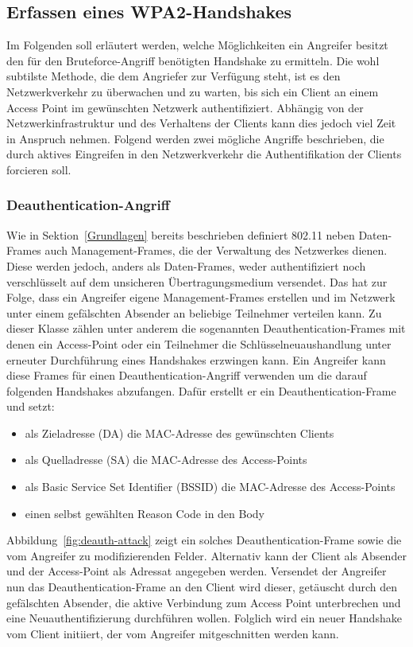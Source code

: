 \subsection{Erfassen eines WPA2-Handshakes}
Im Folgenden soll erläutert werden, welche Möglichkeiten ein Angreifer besitzt den für den Bruteforce-Angriff benötigten Handshake zu ermitteln. 
Die wohl subtilste Methode, die dem Angriefer zur Verfügung steht, ist es den Netzwerkverkehr zu überwachen und zu warten, bis sich ein Client an einem Access Point im gewünschten Netzwerk authentifiziert. 
Abhängig von der Netzwerkinfrastruktur und des Verhaltens der Clients kann dies jedoch viel Zeit in Anspruch nehmen.
Folgend werden zwei mögliche Angriffe beschrieben, die durch aktives Eingreifen in den Netzwerkverkehr die Authentifikation der Clients forcieren soll.

\subsubsection{Deauthentication-Angriff}\label{subs:deauthentication-attack}
Wie in Sektion~\ref{Grundlagen} bereits beschrieben definiert 802.11 neben Daten-Frames auch Management-Frames, die der Verwaltung des Netzwerkes dienen.
Diese werden jedoch, anders als Daten-Frames, weder authentifiziert noch verschlüsselt auf dem unsicheren Übertragungsmedium versendet.
Das hat zur Folge, dass ein Angreifer eigene Management-Frames erstellen und im Netzwerk unter einem gefälschten Absender an beliebige Teilnehmer verteilen kann.
Zu dieser Klasse zählen unter anderem die sogenannten Deauthentication-Frames mit denen ein Access-Point oder ein Teilnehmer die Schlüsselneuaushandlung unter erneuter Durchführung eines Handshakes erzwingen kann.
Ein Angreifer kann diese Frames für einen Deauthentication-Angriff verwenden um die darauf folgenden Handshakes abzufangen.
Dafür erstellt er ein Deauthentication-Frame und setzt:
\begin{itemize}
	\item als Zieladresse (DA) die MAC-Adresse des gewünschten Clients
	\item als Quelladresse (SA) die MAC-Adresse des Access-Points
	\item als Basic Service Set Identifier (BSSID) die MAC-Adresse des Access-Points
	\item einen selbst gewählten Reason Code in den Body
\end{itemize}
Abbildung~\ref{fig:deauth-attack} zeigt ein solches Deauthentication-Frame sowie die vom Angreifer zu modifizierenden Felder.
Alternativ kann der Client als Absender und der Access-Point als Adressat angegeben werden.
Versendet der Angreifer nun das Deauthentication-Frame an den Client wird dieser, getäuscht durch den gefälschten Absender, die aktive Verbindung zum Access Point unterbrechen und eine Neuauthentifizierung durchführen wollen.
Folglich wird ein neuer Handshake vom Client initiiert, der vom Angreifer mitgeschnitten werden kann.

